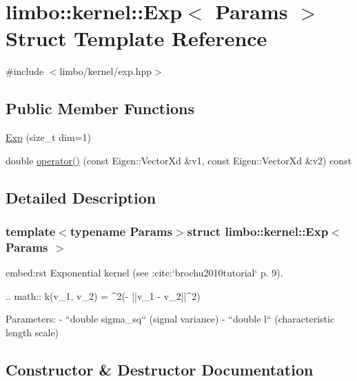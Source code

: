 \hypertarget{structlimbo_1_1kernel_1_1_exp}{}\section{limbo\+:\+:kernel\+:\+:Exp$<$ Params $>$ Struct Template Reference}
\label{structlimbo_1_1kernel_1_1_exp}


{\ttfamily \#include $<$limbo/kernel/exp.\+hpp$>$}

\subsection*{Public Member Functions}
\begin{DoxyCompactItemize}
\item 
\hyperlink{structlimbo_1_1kernel_1_1_exp_abec48720f518fa51be7f74bf102add09}{Exp} (size\+\_\+t dim=1)
\item 
double \hyperlink{structlimbo_1_1kernel_1_1_exp_a50951330db2210da72d2ea8fc9ef8b96}{operator()} (const Eigen\+::\+Vector\+Xd \&v1, const Eigen\+::\+Vector\+Xd \&v2) const 
\end{DoxyCompactItemize}


\subsection{Detailed Description}
\subsubsection*{template$<$typename Params$>$struct limbo\+::kernel\+::\+Exp$<$ Params $>$}

\begin{DoxyVerb}embed:rst
Exponential kernel (see :cite:`brochu2010tutorial` p. 9).

.. math::
    k(v_1, v_2)  = \sigma^2\exp \Big(- ||v_1 - v_2||^2\Big)

Parameters:
  - ``double sigma_sq`` (signal variance)
  - ``double l`` (characteristic length scale)
\end{DoxyVerb}
 

\subsection{Constructor \& Destructor Documentation}
\hypertarget{structlimbo_1_1kernel_1_1_exp_abec48720f518fa51be7f74bf102add09}{}
